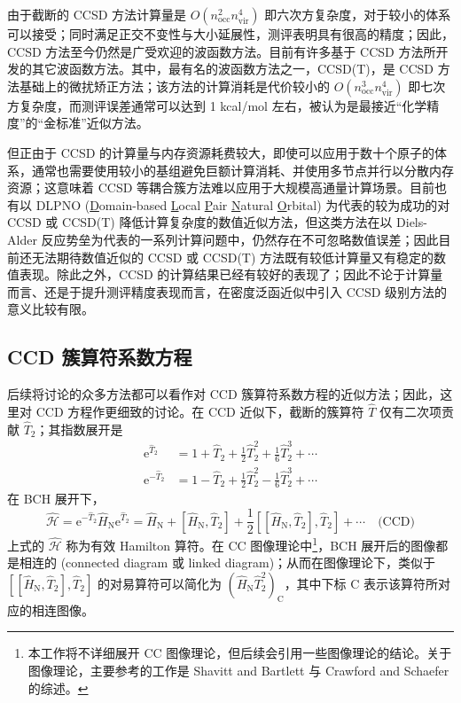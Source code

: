 由于截断的 CCSD 方法计算量是 $O(n_\mathrm{occ}^2 n_\mathrm{vir}^4)$ 即六次方复杂度，对于较小的体系可以接受；同时满足正交不变性与大小延展性，测评表明具有很高的精度；因此，CCSD 方法至今仍然是广受欢迎的波函数方法。目前有许多基于 CCSD 方法所开发的其它波函数方法。其中，最有名的波函数方法之一，CCSD(T)，是 CCSD 方法基础上的微扰矫正方法\cite{Raghavachari-Head-Gordon.CPL.1989}；该方法的计算消耗是代价较小的 $O(n_\mathrm{occ}^3 n_\mathrm{vir}^4)$ 即七次方复杂度，而测评误差通常可以达到 1 kcal/mol 左右，被认为是最接近“化学精度”的“金标准”近似方法。

但正由于 CCSD 的计算量与内存资源耗费较大，即使可以应用于数十个原子的体系，通常也需要使用较小的基组避免巨额计算消耗、并使用多节点并行以分散内存资源\cite{Shen-Scheffler.JCTC.2019}；这意味着 CCSD 等耦合簇方法难以应用于大规模高通量计算场景。目前也有以 DLPNO (\underline{D}omain-based \underline{L}ocal \underline{P}air \underline{N}atural \underline{O}rbital) 为代表的较为成功的对 CCSD 或 CCSD(T) 降低计算复杂度的数值近似方法\cite{Riplinger-Neese.JCP.2013, Riplinger-Neese.JCP.2013a, Guo-Neese.JCP.2018}，但这类方法在以 Diels-Alder 反应势垒为代表的一系列计算问题中，仍然存在不可忽略数值误差\cite{Sandler-Ho.JPCA.2021}；因此目前还无法期待数值近似的 CCSD 或 CCSD(T) 方法既有较低计算量又有稳定的数值表现。除此之外，CCSD 的计算结果已经有较好的表现了；因此不论于计算量而言、还是于提升测评精度表现而言，在密度泛函近似中引入 CCSD 级别方法的意义比较有限。

\subsection{CCD 簇算符系数方程}

后续将讨论的众多方法都可以看作对 CCD 簇算符系数方程的近似方法；因此，这里对 CCD 方程作更细致的讨论。在 CCD 近似下，截断的簇算符 $\hat T$ 仅有二次项贡献 $\hat T_2$；其指数展开是
\begin{align*}
  \mathrm{e}^{\hat T_2} &= 1 + \hat T_2 + \frac{1}{2} \hat T_2^2 + \frac{1}{6} \hat T_2^3 + \cdots \\
  \mathrm{e}^{- \hat T_2} &= 1 - \hat T_2 + \frac{1}{2} \hat T_2^2 - \frac{1}{6} \hat T_2^3 + \cdots
\end{align*}
在 BCH 展开下，
\begin{equation}
  \hat{\mathcal{H}} = \mathrm{e}^{-\hat T_2} \hat H_\mathrm{N} \mathrm{e}^{\hat T_2} = \hat H_\mathrm{N} + [\hat H_\mathrm{N}, \hat T_2] + \frac{1}{2} [[\hat H_\mathrm{N}, \hat T_2], \hat T_2] + \cdots \quad \text{(CCD)}
\end{equation}
上式的 $\hat{\mathcal{H}}$ 称为有效 Hamilton 算符。在 CC 图像理论中\footnote{本工作将不详细展开 CC 图像理论，但后续会引用一些图像理论的结论。关于图像理论，主要参考的工作是 Shavitt and Bartlett\cite{Shavitt-Bartlett.Cambridge.2009} 与 Crawford and Schaefer\cite{Crawford-Schaefer.RCC.2007} 的综述。}，BCH 展开后的图像都是相连的 (connected diagram 或 linked diagram)；从而在图像理论下，类似于 $[[\hat H_\mathrm{N}, \hat T_2], \hat T_2]$ 的对易算符可以简化为 $(\hat H_\mathrm{N} \hat T_2^2)_\mathrm{C}$，其中下标 $\mathrm{C}$ 表示该算符所对应的相连图像。


